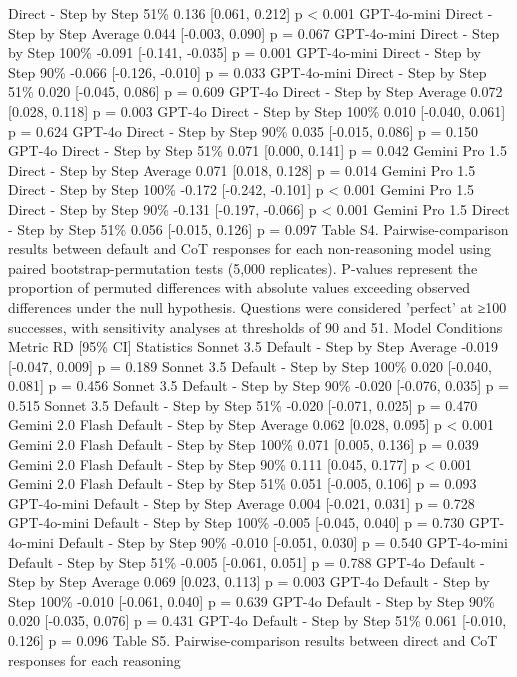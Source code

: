 Direct - Step by Step
51\%
0.136 [0.061, 0.212]
p < 0.001
GPT-4o-mini
Direct - Step by Step
Average
0.044 [-0.003, 0.090]
p = 0.067
GPT-4o-mini
Direct - Step by Step
100\%
-0.091 [-0.141, -0.035]
p = 0.001
GPT-4o-mini
Direct - Step by Step
90\%
-0.066 [-0.126, -0.010]
p = 0.033
GPT-4o-mini
Direct - Step by Step
51\%
0.020 [-0.045, 0.086]
p = 0.609
GPT-4o
Direct - Step by Step
Average
0.072 [0.028, 0.118]
p = 0.003
GPT-4o
Direct - Step by Step
100\%
0.010 [-0.040, 0.061]
p = 0.624
GPT-4o
Direct - Step by Step
90\%
0.035 [-0.015, 0.086]
p = 0.150
GPT-4o
Direct - Step by Step
51\%
0.071 [0.000, 0.141]
p = 0.042
Gemini Pro 1.5
Direct - Step by Step
Average
0.071 [0.018, 0.128]
p = 0.014
Gemini Pro 1.5
Direct - Step by Step
100\%
-0.172 [-0.242, -0.101]
p < 0.001
Gemini Pro 1.5
Direct - Step by Step
90\%
-0.131 [-0.197, -0.066]
p < 0.001
Gemini Pro 1.5
Direct - Step by Step
51\%
0.056 [-0.015, 0.126]
p = 0.097
Table S4. Pairwise-comparison results between default and CoT responses for each
non-reasoning model using paired bootstrap-permutation tests (5,000 replicates). P-values
represent the proportion of permuted differences with absolute values exceeding observed
differences under the null hypothesis. Questions were considered 'perfect' at ≥100 successes,
with sensitivity analyses at thresholds of 90 and 51.
Model
Conditions
Metric
RD [95\% CI]
Statistics
Sonnet 3.5
Default - Step by Step
Average
-0.019 [-0.047, 0.009]
p = 0.189
Sonnet 3.5
Default - Step by Step
100\%
0.020 [-0.040, 0.081]
p = 0.456
Sonnet 3.5
Default - Step by Step
90\%
-0.020 [-0.076, 0.035]
p = 0.515
Sonnet 3.5
Default - Step by Step
51\%
-0.020 [-0.071, 0.025]
p = 0.470
Gemini 2.0 Flash
Default - Step by Step
Average
0.062 [0.028, 0.095]
p < 0.001
Gemini 2.0 Flash
Default - Step by Step
100\%
0.071 [0.005, 0.136]
p = 0.039
Gemini 2.0 Flash
Default - Step by Step
90\%
0.111 [0.045, 0.177]
p < 0.001
Gemini 2.0 Flash
Default - Step by Step
51\%
0.051 [-0.005, 0.106]
p = 0.093
GPT-4o-mini
Default - Step by Step
Average
0.004 [-0.021, 0.031]
p = 0.728
GPT-4o-mini
Default - Step by Step
100\%
-0.005 [-0.045, 0.040]
p = 0.730
GPT-4o-mini
Default - Step by Step
90\%
-0.010 [-0.051, 0.030]
p = 0.540
GPT-4o-mini
Default - Step by Step
51\%
-0.005 [-0.061, 0.051]
p = 0.788
GPT-4o
Default - Step by Step
Average
0.069 [0.023, 0.113]
p = 0.003
GPT-4o
Default - Step by Step
100\%
-0.010 [-0.061, 0.040]
p = 0.639
GPT-4o
Default - Step by Step
90\%
0.020 [-0.035, 0.076]
p = 0.431
GPT-4o
Default - Step by Step
51\%
0.061 [-0.010, 0.126]
p = 0.096
Table S5. Pairwise-comparison results between direct and CoT responses for each reasoning
